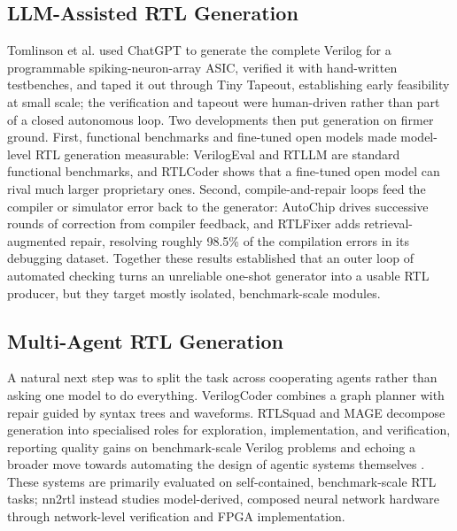 \documentclass[acmtog,authorversion]{acmart}
\begin{document}
\subsection{LLM-Assisted RTL Generation}
Tomlinson et al. \cite{tomlinson2024} used ChatGPT to generate the complete Verilog for a programmable spiking-neuron-array ASIC, verified it with hand-written testbenches, and taped it out through Tiny Tapeout, establishing early feasibility at small scale; the verification and tapeout were human-driven rather than part of a closed autonomous loop. Two developments then put generation on firmer ground. First, functional benchmarks and fine-tuned open models made model-level RTL generation measurable: VerilogEval \cite{liu2023verilogeval} and RTLLM \cite{lu2024} are standard functional benchmarks, and RTLCoder \cite{liu2024rtlcoder} shows that a fine-tuned open model can rival much larger proprietary ones. Second, compile-and-repair loops feed the compiler or simulator error back to the generator: AutoChip \cite{thakur2024autochip} drives successive rounds of correction from compiler feedback, and RTLFixer \cite{tsai2024rtlfixer} adds retrieval-augmented repair, resolving roughly 98.5\% of the compilation errors in its debugging dataset. Together these results established that an outer loop of automated checking turns an unreliable one-shot generator into a usable RTL producer, but they target mostly isolated, benchmark-scale modules.%


\subsection{Multi-Agent RTL Generation}
A natural next step was to split the task across cooperating agents rather than asking one model to do everything. VerilogCoder \cite{ho2025verilogcoder} combines a graph planner with repair guided by syntax trees and waveforms. RTLSquad \cite{wang2025rtlsquad} and MAGE \cite{zhao2024mage} decompose generation into specialised roles for exploration, implementation, and verification, reporting quality gains on benchmark-scale Verilog problems and echoing a broader move towards automating the design of agentic systems themselves \cite{hu2024}. These systems are primarily evaluated on self-contained, benchmark-scale RTL tasks; nn2rtl instead studies model-derived, composed neural network hardware through network-level verification and FPGA implementation.
\end{document}
